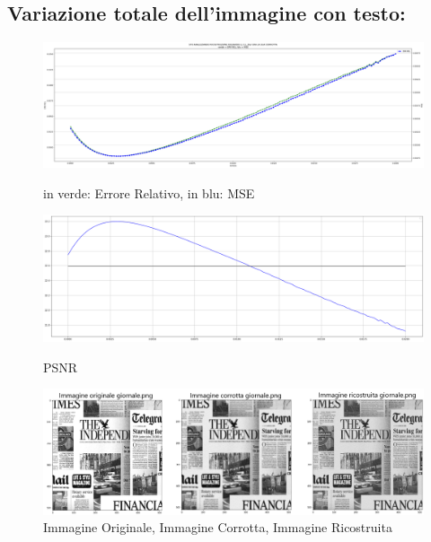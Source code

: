 \subsection{Variazione totale dell'immagine con testo:}
\begin{figure}[H]
    \centering
    \includegraphics[width=\textwidth]{IMMAGINI_RELAZIONE/graficoGiornaleTOTVAR_ERRREL&MSE.png}
    \caption{in verde: Errore Relativo, in blu: MSE}
    \includegraphics[width=\textwidth]{IMMAGINI_RELAZIONE/graficoGiornaleTOTVAR_PSNR&suaMedia.png}
    \caption{PSNR}
    \includegraphics[width=\textwidth]{imgRicostruzione/ricostruzioneGiornale_TOTVAR_maxPSNR23.20.png}
    \caption{Immagine Originale, Immagine Corrotta, Immagine Ricostruita}
\end{figure}
